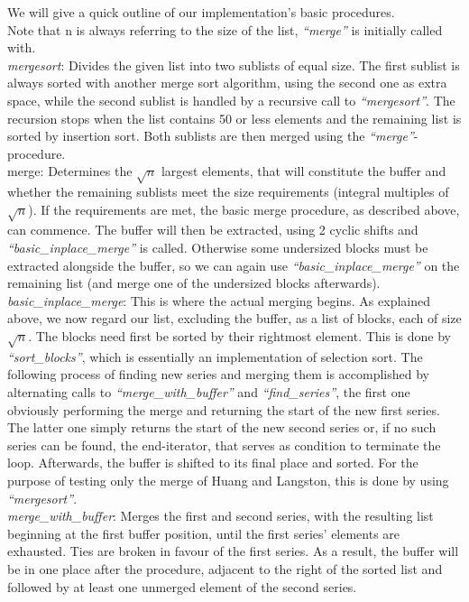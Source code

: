 \documentclass[11pt,pdftex,a4paper, twocolumn]{article}
\begin{document}
We will give a quick outline of our implementation’s basic procedures. \\
Note that n is always referring to the size of the list, \textit{“merge”} is initially called with. \\
\textit{mergesort}: Divides the given list into two sublists of equal size. The first sublist is always sorted with another merge sort algorithm, using the second one as extra space, while the second sublist is handled by a recursive call to \textit{“mergesort”}. The recursion stops when the list contains 50 or less elements and the remaining list is sorted by insertion sort.  Both sublists are then merged using the \textit{“merge”}-procedure. \\
merge: Determines the $\sqrt{n}$ largest elements, that will constitute the buffer and whether the remaining sublists meet the size requirements (integral multiples of $\sqrt{n}$). If the requirements are met, the basic merge procedure, as described above, can commence. The buffer will then be extracted, using 2 cyclic shifts and \textit{“basic\_inplace\_merge”} is called. Otherwise some undersized blocks must be extracted alongside the buffer, so we can again use \textit{“basic\_inplace\_merge”} on the remaining list (and merge one of the undersized blocks afterwards). \\
\textit{basic\_inplace\_merge}: This is where the actual merging begins. As explained above, we now regard our list, excluding the buffer, as a list of blocks, each of size $\sqrt{n}$. The blocks need first be sorted by their rightmost element. This is done by \textit{“sort\_blocks”}, which is essentially an implementation of selection sort. The following process of finding new series and merging them is accomplished by alternating calls to \textit{“merge\_with\_buffer”} and \textit{“find\_series”}, the first one obviously performing the merge and returning the start of the new first series. The latter one simply returns the start of the new second series or, if no such series can be found, the end-iterator, that serves as condition to terminate the loop. Afterwards, the buffer is shifted to its final place and sorted. For the purpose of testing only the merge of Huang and Langston, this is done by using \textit{“mergesort”}. \\
\textit{merge\_with\_buffer}: Merges the first and second series, with the resulting list beginning at the first buffer position, until the first series’ elements are exhausted. Ties are broken in favour of the first series. As a result, the buffer will be in one place after the procedure, adjacent to the right of the sorted list and followed by at least one unmerged element of the second series.
\end{document}
